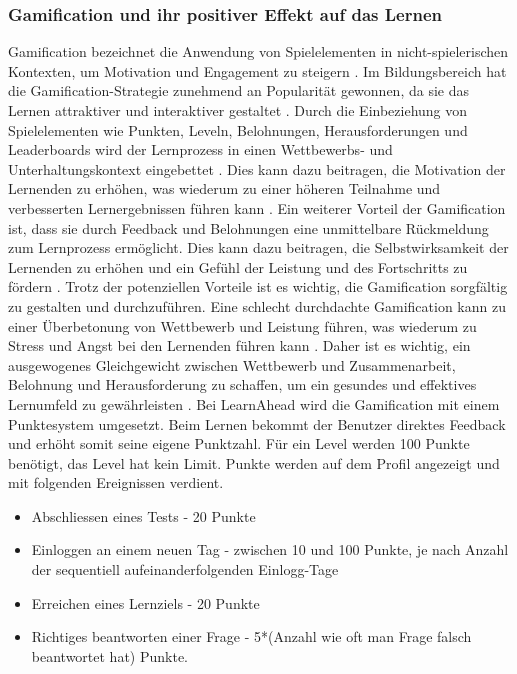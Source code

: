 \subsubsection{Gamification und ihr positiver Effekt auf das Lernen}
Gamification bezeichnet die Anwendung von Spielelementen in nicht-spielerischen Kontexten, um Motivation und Engagement zu steigern \cite{Deterding2011}. Im Bildungsbereich hat die Gamification-Strategie zunehmend an Popularität gewonnen, da sie das Lernen attraktiver und interaktiver gestaltet \cite{Hamari2014}.\newline
Durch die Einbeziehung von Spielelementen wie Punkten, Leveln, Belohnungen, Herausforderungen und Leaderboards wird der Lernprozess in einen Wettbewerbs- und Unterhaltungskontext eingebettet \cite{Kapp2012}. Dies kann dazu beitragen, die Motivation der Lernenden zu erhöhen, was wiederum zu einer höheren Teilnahme und verbesserten Lernergebnissen führen kann \cite{Hanus2015}.\newline
Ein weiterer Vorteil der Gamification ist, dass sie durch Feedback und Belohnungen eine unmittelbare Rückmeldung zum Lernprozess ermöglicht. Dies kann dazu beitragen, die Selbstwirksamkeit der Lernenden zu erhöhen und ein Gefühl der Leistung und des Fortschritts zu fördern \cite{Landers2014}. \newline
Trotz der potenziellen Vorteile ist es wichtig, die Gamification sorgfältig zu gestalten und durchzuführen. Eine schlecht durchdachte Gamification kann zu einer Überbetonung von Wettbewerb und Leistung führen, was wiederum zu Stress und Angst bei den Lernenden führen kann \cite{Nicholson2015}. Daher ist es wichtig, ein ausgewogenes Gleichgewicht zwischen Wettbewerb und Zusammenarbeit, Belohnung und Herausforderung zu schaffen, um ein gesundes und effektives Lernumfeld zu gewährleisten \cite{Deterding2011}.\newline
Bei LearnAhead wird die Gamification mit einem Punktesystem umgesetzt. Beim Lernen bekommt der Benutzer direktes Feedback und erhöht somit seine eigene Punktzahl. Für ein Level werden 100 Punkte benötigt, das Level hat kein Limit. Punkte werden auf dem Profil angezeigt und mit folgenden Ereignissen verdient.
\begin{itemize}
  \item Abschliessen eines Tests - 20 Punkte
  \item Einloggen an einem neuen Tag - zwischen 10 und 100 Punkte, je nach Anzahl der sequentiell aufeinanderfolgenden Einlogg-Tage
  \item Erreichen eines Lernziels - 20 Punkte
  \item Richtiges beantworten einer Frage - 5*(Anzahl wie oft man Frage falsch beantwortet hat) Punkte.
\end{itemize}
